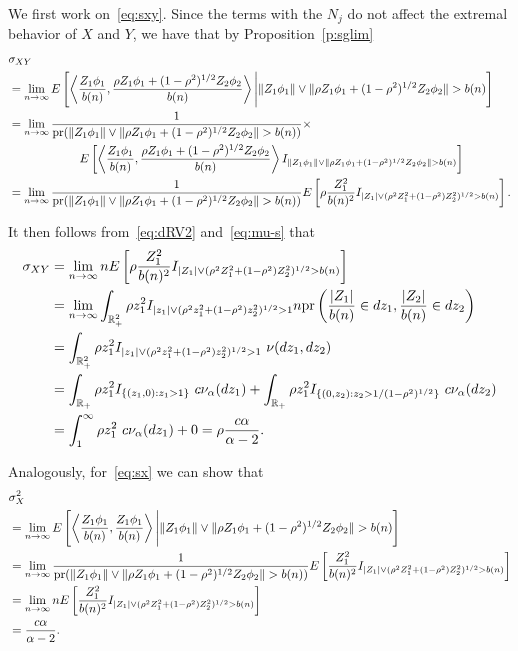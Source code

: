 \documentclass[lineno]{biometrika}
\newcommand \ag{\alpha}
\newcommand \sg{\sigma}
\newcommand\mbR{{\mathbb R}}
\newcommand\lp{\left (}
\newcommand\rp{\right )}
\newcommand\lb{\left [}
\newcommand\rb{\right ]}
\newcommand\lip{\left \langle}
\newcommand\rip{\right \rangle}
\begin{document}
We first work on~\eqref{eq:sxy}. Since the terms with the $N_j$ do not affect the extremal behavior of $X$ and $Y$, we have that by Proposition~\ref{p:sglim}
\begin{align*}
&\sg_{XY} \\
&= \lim_{n \to \infty} E \lb \lip \frac{Z_1 \phi_1}{b(n)}, \frac{\rho Z_1 \phi_1+(1-\rho^2)^{1/2} Z_2 \phi_2}{b(n)}\rip  \Bigg| \| Z_1 \phi_1 \|  \vee  \| \rho Z_1 \phi_1+(1-\rho^2)^{1/2} Z_2 \phi_2 \| > b(n)\rb  \\
&= \lim_{n \to \infty} \frac{1}{{\rm pr}(\| Z_1 \phi_1 \|  \vee  \| \rho Z_1 \phi_1+(1-\rho^2)^{1/2} Z_2 \phi_2 \| > b(n))} \times \\
&\ \ \ \ \ \ \ \ \ \ \ \ \ \ \ \ \ \ E \lb \lip \frac{Z_1 \phi_1}{b(n)}, \frac{\rho Z_1 \phi_1+(1-\rho^2)^{1/2} Z_2 \phi_2}{b(n)}\rip  I_{\| Z_1 \phi_1 \|  \vee  \| \rho Z_1 \phi_1+(1-\rho^2)^{1/2} Z_2 \phi_2 \| > b(n)}\rb  \\
&= \lim_{n \to \infty} \frac{1}{{\rm pr}(\| Z_1 \phi_1 \|  \vee  \| \rho Z_1 \phi_1+(1-\rho^2)^{1/2} Z_2 \phi_2 \| > b(n))}   E \lb  \rho \frac{Z_1^2 }{b(n)^2} I_{|Z_1| \vee (\rho^2 Z_1^2 +(1-\rho^2)Z_2^2 )^{1/2} > b(n)} \rb.
\end{align*}



It then follows from~\eqref{eq:dRV2} and~\eqref{eq:mu-s} that
\begin{align*}
\sg_{XY} &= \lim_{n \to \infty} n E \lb  \rho \frac{Z_1^2 }{b(n)^2} I_{|Z_1| \vee (\rho^2 Z_1^2 +(1-\rho^2)Z_2^2 )^{1/2} > b(n)} \rb \\
&= \lim_{n \to \infty} \int_{\mbR^2_+} \rho z_1^2 I_{ |z_1| \vee ( \rho^2 z_1^2 + (1-\rho^2) z_2^2 )^{1/2} >1} n{\rm pr}\lp \frac{|Z_1|}{b(n)} \in dz_1, \frac{|Z_2|}{b(n)}\in dz_2 \rp \\
&= \int_{\mbR_+^2}  \rho z_1^2 I_{ |z_1| \vee ( \rho^2 z_1^2 + (1-\rho^2) z_2^2 )^{1/2} >1} \ \nu(dz_1, dz_2) \\
& = \int_{\mbR_+}  \rho z_1^2 I_{ \{(z_1, 0): z_1>1\} } \ c\nu_{\ag}(dz_1) + \int_{\mbR_+}  \rho z_1^2 I_{ \{(0, z_2): z_2>1/(1-\rho^2)^{1/2} \}} \ c\nu_{\ag}(dz_2) \\
&= \int_{1}^{\infty}  \rho z_1^2 \ c\nu_{\alpha}(dz_1) + 0 = \rho \frac{c\ag}{\ag-2}.
\end{align*}

Analogously, for~\eqref{eq:sx} we can show that
\begin{align*}
&\sg_{X}^2 \\
&= \lim_{n \to \infty} E \lb \lip \frac{Z_1 \phi_1}{b(n)}, \frac{Z_1 \phi_1}{b(n)}\rip  \Bigg| \| Z_1 \phi_1 \|  \vee  \| \rho Z_1 \phi_1+(1-\rho^2)^{1/2} Z_2 \phi_2 \| > b(n)\rb  \\
&= \lim_{n \to \infty} \frac{1}{{\rm pr}(\| Z_1 \phi_1 \|  \vee  \| \rho Z_1 \phi_1+(1-\rho^2)^{1/2} Z_2 \phi_2 \| > b(n))}  E \lb  \frac{Z_1^2 }{b(n)^2} I_{|Z_1| \vee (\rho^2 Z_1^2 +(1-\rho^2)Z_2^2 )^{1/2} > b(n)} \rb \\
&= \lim_{n \to \infty} nE \lb  \frac{Z_1^2 }{b(n)^2} I_{|Z_1| \vee (\rho^2 Z_1^2 +(1-\rho^2)Z_2^2 )^{1/2} > b(n)} \rb \\
&=\frac{c\ag}{\ag-2}.
\end{align*}
\end{document}

